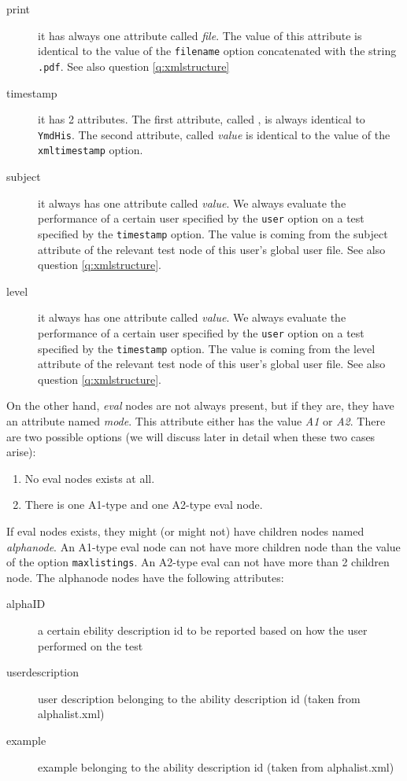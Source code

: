 \documentclass{scrartcl}
\begin{document}
\begin{description}
\item[print] it has always one attribute called \emph{file}. The value of this attribute is identical to the value of the \verb+filename+ option concatenated with the string \verb+.pdf+. See also question \ref{q:xmlstructure}
\item[timestamp] it has 2 attributes. The first attribute, called , is always identical to \verb+YmdHis+. The second attribute, called \emph{value} is identical to the value of the \verb+xmltimestamp+ option.
\item[subject] it always has one attribute called \emph{value}. We always evaluate the performance of a certain user specified by the \verb+user+ option on a test specified by the \verb+timestamp+ option. The value is coming from the subject attribute of the relevant test node of this user's global user file. See also question \ref{q:xmlstructure}.
\item[level] it always has one attribute called \emph{value}. We always evaluate the performance of a certain user specified by the \verb+user+ option on a test specified by the \verb+timestamp+ option. The value is coming from the level attribute of the relevant test node of this user's global user file. See also question \ref{q:xmlstructure}.
\end{description}
On the other hand, \emph{eval} nodes are not always present, but if they are, they have an attribute named \emph{mode}. This attribute either has the value \emph{A1} or \emph{A2}. There are two possible options (we will discuss later in detail when these two cases arise):
\begin{enumerate}
\item No eval nodes exists at all.
\item There is one A1-type and one A2-type eval node.
\end{enumerate}
If eval nodes exists, they might (or might not) have children nodes named \emph{alphanode}. An A1-type eval node can not have more children node than the value of the option \verb+maxlistings+. An A2-type eval can not have more than 2 children node. The alphanode nodes have the following attributes:
\begin{description}
\item[alphaID] a certain ebility description id to be reported based on how the user performed on the test
\item[userdescription] user description belonging to the ability description id (taken from alphalist.xml) 
\item[example] example belonging to the ability description id (taken from alphalist.xml)
\end{description}
\end{document}
